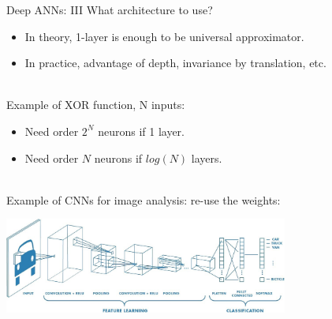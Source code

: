 \documentclass{beamer}
\begin{document}
\begin{frame}{Deep ANNs: III}
    What architecture to use?

    \begin{itemize}
        \item In theory, 1-layer is enough to be universal approximator.
        \item In practice, advantage of depth, invariance by translation, etc. \\~\\
    \end{itemize}

    Example of XOR function, N inputs:

    \begin{itemize}
        \item Need order $2^N$ neurons if 1 layer.
        \item Need order $N$ neurons if $log(N)$ layers. \\~\\
    \end{itemize}

    Example of CNNs for image analysis: re-use the weights:


    \begin{center}
      \includegraphics[width=0.7\textwidth]{./Figures/deepCNN}
    \end{center}
\end{frame}
\end{document}
